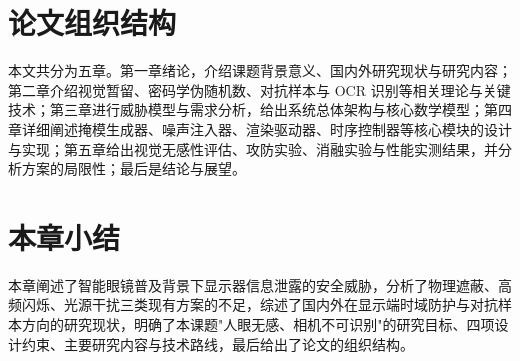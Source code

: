 \section{论文组织结构}

本文共分为五章。第一章绪论，介绍课题背景意义、国内外研究现状与研究内容；第二章介绍视觉暂留、密码学伪随机数、对抗样本与 OCR 识别等相关理论与关键技术；第三章进行威胁模型与需求分析，给出系统总体架构与核心数学模型；第四章详细阐述掩模生成器、噪声注入器、渲染驱动器、时序控制器等核心模块的设计与实现；第五章给出视觉无感性评估、攻防实验、消融实验与性能实测结果，并分析方案的局限性；最后是结论与展望。

\section{本章小结}

本章阐述了智能眼镜普及背景下显示器信息泄露的安全威胁，分析了物理遮蔽、高频闪烁、光源干扰三类现有方案的不足，综述了国内外在显示端时域防护与对抗样本方向的研究现状，明确了本课题"人眼无感、相机不可识别"的研究目标、四项设计约束、主要研究内容与技术路线，最后给出了论文的组织结构。
